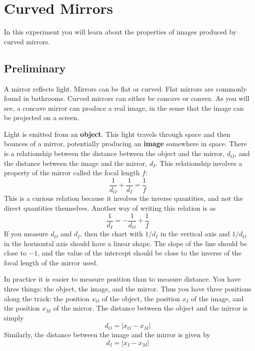 \setcounter{chapter}{6}
\chapter{Curved Mirrors}
In this experiment you will learn about the properties of images produced by curved mirrors.
\section{Preliminary}
A mirror reflects light. Mirrors can be flat or curved. Flat mirrors are commonly found in bathrooms. Curved mirrors can either be concave or convex. As you will see, a concave mirror can produce a real image, in the sense that the image can be projected on a screen.

Light is emitted from an \textbf{object}. This light travels through space and then bounces of a mirror, potentially producing an \textbf{image} somewhere in space. There is a relationship between the distance between the object and the mirror, $d_{O}$, and the distance between the image and the mirror, $d_{I}$. This relationship involves a property of the mirror called the focal length $f$:
\begin{equation}
    \frac{1}{d_{O}} + \frac{1}{d_{I}} = \frac{1}{f}
\end{equation}
This is a curious relation because it involves the inverse quantities, and not the direct quantities themselves. Another way of writing this relation is as
\begin{equation}
    \frac{1}{d_{I}} = -\frac{1}{d_{O}} + \frac{1}{f}
\end{equation}
If you measure $d_{O}$ and $d_{I}$, then the chart with $1/d_{I}$ in the vertical axis and $1/d_{O}$ in the horizontal axis should have a linear shape. The slope of the line should be close to $-1$, and the value of the intercept should be close to the inverse of the focal length of the mirror used.

In practice it is easier to measure position than to measure distance. You have three things: the object, the image, and the mirror. Thus you have three positions along the track: the position $x_{O}$ of the object, the position $x_{I}$ of the image, and the position $x_{M}$ of the mirror. The distance between the object and the mirror is simply
\begin{equation}
    d_{O} = \left\vert x_{O} - x_{M} \right\vert
\end{equation}
Similarly, the distance between the image and the mirror is given by
\begin{equation}
    d_{I} = \left\vert x_{I} - x_{M} \right\vert
\end{equation}
